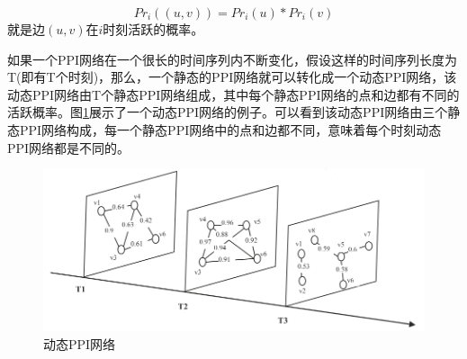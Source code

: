 \begin{equation}\label{dppi4}
Pr_i((u,v))= Pr_i(u)*Pr_i(v)
\end{equation}
就是边$(u,v)$在$i$时刻活跃的概率。

如果一个PPI网络在一个很长的时间序列内不断变化，假设这样的时间序列长度为T(即有T个时刻)，那么，一个静态的PPI网络就可以转化成一个动态PPI网络，该动态PPI网络由T个静态PPI网络组成，其中每个静态PPI网络的点和边都有不同的活跃概率。图\ref{fig:dppi}展示了一个动态PPI网络的例子。可以看到该动态PPI网络由三个静态PPI网络构成，每一个静态PPI网络中的点和边都不同，意味着每个时刻动态PPI网络都是不同的。

\begin{figure}[htbp]
\centering
\includegraphics[height=0.25\textheight]{pic/dppi.png}
\captionsetup{margin=50pt}
\caption{动态PPI网络 \cite{zhang2016method} \label{fig:dppi}}
\end{figure}
